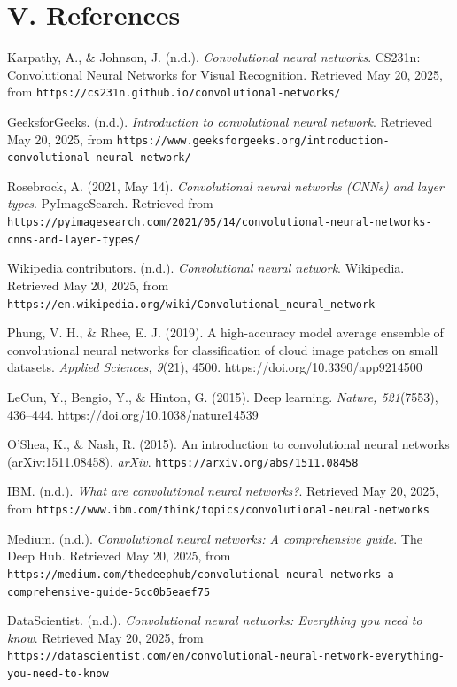\documentclass[12pt]{article}
\begin{document}
\newpage
\section*{V. References}

{\footnotesize           %
 \setlength{\parskip}{0.5ex}        %
 \setlength{\baselineskip}{1.1\baselineskip} %
 \raggedright           %
 \sloppy                %

Karpathy, A., \& Johnson, J. (n.d.). \textit{Convolutional neural networks}. CS231n: Convolutional Neural Networks for Visual Recognition. Retrieved May 20, 2025, from \verb|https://cs231n.github.io/convolutional-networks/|

\medskip
GeeksforGeeks. (n.d.). \textit{Introduction to convolutional neural network}. Retrieved May 20, 2025, from \verb|https://www.geeksforgeeks.org/introduction-convolutional-neural-network/|

\medskip
Rosebrock, A. (2021, May 14). \textit{Convolutional neural networks (CNNs) and layer types}. PyImageSearch. Retrieved from \verb|https://pyimagesearch.com/2021/05/14/convolutional-neural-networks-cnns-and-layer-types/|

\medskip
Wikipedia contributors. (n.d.). \textit{Convolutional neural network}. Wikipedia. Retrieved May 20, 2025, from \verb|https://en.wikipedia.org/wiki/Convolutional_neural_network|

\medskip
Phung, V. H., \& Rhee, E. J. (2019). A high-accuracy model average ensemble of convolutional neural networks for classification of cloud image patches on small datasets. \textit{Applied Sciences, 9}(21), 4500. https://doi.org/10.3390/app9214500

\medskip
LeCun, Y., Bengio, Y., \& Hinton, G. (2015). Deep learning. \textit{Nature, 521}(7553), 436–444. https://doi.org/10.1038/nature14539

\medskip
O’Shea, K., \& Nash, R. (2015). An introduction to convolutional neural networks (arXiv:1511.08458). \textit{arXiv}. \verb|https://arxiv.org/abs/1511.08458|

\medskip
IBM. (n.d.). \textit{What are convolutional neural networks?}. Retrieved May 20, 2025, from \verb|https://www.ibm.com/think/topics/convolutional-neural-networks|

\medskip
Medium. (n.d.). \textit{Convolutional neural networks: A comprehensive guide}. The Deep Hub. Retrieved May 20, 2025, from \verb|https://medium.com/thedeephub/convolutional-neural-networks-a-comprehensive-guide-5cc0b5eaef75|

\medskip
DataScientist. (n.d.). \textit{Convolutional neural networks: Everything you need to know}. Retrieved May 20, 2025, from \verb|https://datascientist.com/en/convolutional-neural-network-everything-you-need-to-know|
}
\end{document}
